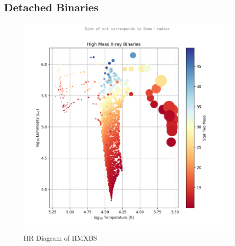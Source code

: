 \documentclass[12pt, letterpaper]{article}
\begin{document}
        \subsection{\centering Detached Binaries}
            \begin{figure}[H] 
                \centering
                \includegraphics[scale = .6]{figs/Generated Figs/ High Mass X-ray Binaries Star Two Mass log10 F star radius T.png}
                \caption{HR Diagram of HMXBS}
                \label{DetachedBinaryHRDiagram}
            \end{figure}
\end{document}

